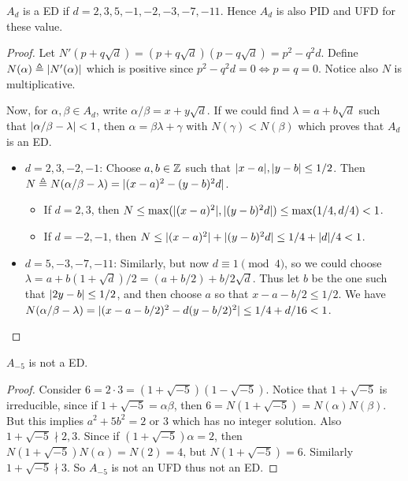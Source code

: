 \begin{theorem}
  $A_d$ is a ED if $d = 2, 3, 5, -1, -2, -3, -7, -11$. Hence $A_d$ is also PID and UFD
  for these value.
  \begin{proof}
    Let $N'(p + q\sqrt{d}) = (p + q\sqrt{d})(p - q\sqrt{d}) = p^2 - q^2 d$.
    Define $N(\alpha) \triangleq \lvert N'(\alpha)\rvert$ which is positive
    since $p^2 - q^2 d = 0 \iff p = q = 0$. Notice also $N$
    is multiplicative.

    Now, for $\alpha, \beta \in A_d$, write $\alpha/\beta = x+y\sqrt{d}$.
    If we could find $\lambda = a+b\sqrt{d}$ such that
    $\lvert\alpha / \beta - \lambda\rvert < 1$, then
    $\alpha = \beta \lambda + \gamma$ with $N(\gamma) < N(\beta)$
    which proves that $A_d$ is an ED.

    \begin{itemize}
      \item $d = 2, 3, -2, -1$:
        Choose $a, b \in \mathbb{Z}$ such that
        $\lvert x - a\rvert, \lvert y - b\rvert \leq 1/2$.
        Then $N \triangleq N(\alpha/\beta - \lambda) = \lvert(x - a)^2 - (y-b)^2d\rvert$.
        \begin{itemize}
          \item If $d = 2, 3$, then $N \leq \max(\lvert(x - a)^2\rvert, \lvert(y-b)^2d\rvert) \leq
            \max(1/4, d/4) < 1$.
          \item If $d = -2, -1$, then $N \leq \lvert(x - a)^2\rvert + \lvert(y-b)^2d\rvert \leq
            1/4 + \lvert d\rvert/4 < 1$.
        \end{itemize}
      \item $d = 5, -3, -7, -11$: Similarly, but now $d \equiv 1 \pmod{4}$,
        so we could choose $\lambda = a + b(1 + \sqrt{d})/2 = (a + b/2) + b/2 \sqrt{d}$.
        Thus let $b$ be the one such that $\lvert2y - b\rvert \leq 1/2$, and
        then choose $a$ so that $x - a - b/2 \leq 1/2$.
        We have $N(\alpha/\beta - \lambda) = \lvert(x - a - b/2)^2 - d (y - b/2)^2\rvert
        \leq 1/4 + d/16 < 1$.
    \end{itemize}
  \end{proof}
\end{theorem}

\begin{example}
  $A_{-5}$ is not a ED.

  \begin{proof}
    Consider $6 = 2 \cdot 3 = (1 + \sqrt{-5})(1 - \sqrt{-5})$.
    Notice that $1 + \sqrt{-5}$ is irreducible, since if $1 + \sqrt{-5} = \alpha \beta$,
    then $6 = N(1 + \sqrt{-5}) = N(\alpha) N(\beta)$. But this implies
    $a^2 + 5b^2 = 2 \text{ or } 3$ which has no integer solution.
    Also $1 + \sqrt{-5} \nmid 2, 3$. Since if $(1 + \sqrt{-5}) \alpha = 2$,
    then $N(1 + \sqrt{-5}) N(\alpha) = N(2) = 4$, but $N(1 + \sqrt{-5}) = 6$.
    Similarly $1 + \sqrt{-5} \nmid 3$. So $A_{-5}$ is not an UFD thus not an ED.
  \end{proof}
\end{example}

